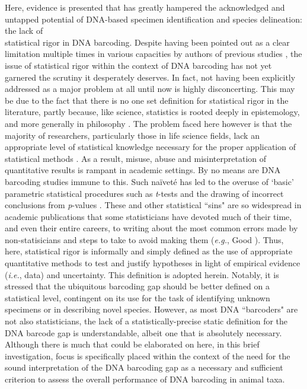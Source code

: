 Here, evidence is presented that has greatly hampered the acknowledged and untapped potential of DNA-based specimen identification and species delineation: the lack of \\ statistical rigor in DNA barcoding. Despite having been pointed out as a clear limitation multiple times in various capacities by authors of previous studies \cite{luo2015simulation, matz2005likelihood, nielsen2006statistical, phillips2019incomplete}, the issue of statistical rigor within the context of DNA barcoding has not yet garnered the scrutiny it desperately deserves. In fact, not having been explicitly addressed as a major problem at all until now is highly disconcerting.  This may be due to the fact that there is no one set definition for statistical rigor in the literature, partly because, like science, statistics is rooted deeply in epistemology, and more generally in philosophy \cite{lindley2000philosophy}. The problem faced here however is that the majority of researchers, particularly those in life science fields, lack an appropriate level of statistical knowledge necessary for the proper application of statistical methods \cite{fieberg2020resampling}. As a result, misuse, abuse and misinterpretation of quantitative results is rampant in academic settings. By no means are DNA barcoding studies immune to this. Such na{\"i}vet{\'e} has led to the overuse of `basic' parametric statistical procedures such as \textit{t}-tests and the drawing of incorrect conclusions from \textit{p}-values \cite{wasserstein2019moving}. These and other statistical ``sins" are so widespread in academic publications that some statisticians have devoted much of their time, and even their entire careers, to writing about the most common errors made by non-statisicians and steps to take to avoid making them (\textit{e.g.}, Good \cite{good2003common}). Thus, here, statistical rigor is informally and simply defined as the use of appropriate quantitative methods to test and justify hypotheses in light of empirical evidence (\textit{i.e.}, data) and uncertainty. This definition is adopted herein. Notably, it is stressed that the ubiquitous barcoding gap should be better defined on a statistical level, contingent on its use for the task of identifying unknown specimens or in describing novel species. However, as most DNA ``barcoders" are not also statisticians, the lack of a statistically-precise static definition for the DNA barcode gap is understandable, albeit one that is absolutely necessary. Although there is much that could be elaborated on here, in this brief investigation, focus is specifically placed within the context of the need for the sound interpretation of the DNA barcoding gap as a necessary and sufficient criterion to assess the overall performance of DNA barcoding in animal taxa.



